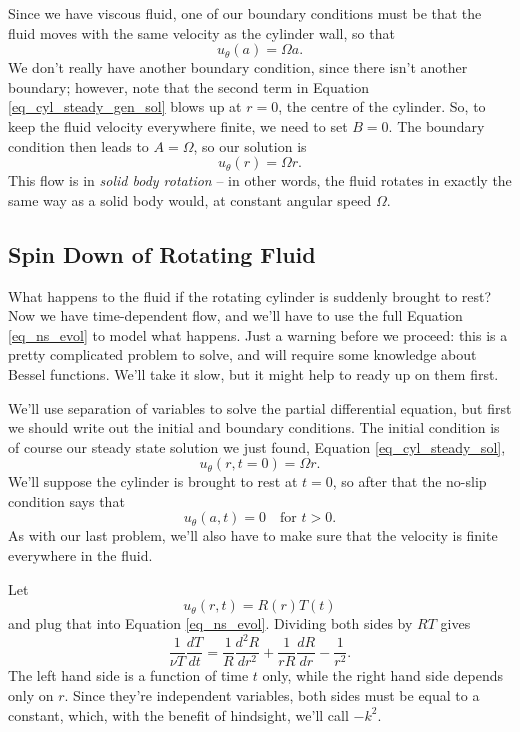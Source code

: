 Since we have viscous fluid, one of our boundary conditions must be that the fluid moves with the same velocity as the cylinder wall, so that
\[
u_\theta(a) = \Omega a.
\]
We don't really have another boundary condition, since there isn't another boundary; however, note that the second term in Equation \ref{eq_cyl_steady_gen_sol} blows up at $r=0$, the centre of the cylinder.  So, to keep the fluid velocity everywhere finite, we need to set $B = 0$.  The boundary condition then leads to $A = \Omega$, so our solution is 
\begin{equation}
\label{eq_cyl_steady_sol}
u_\theta (r) = \Omega r.
\end{equation}
This flow is in \emph{solid body rotation} -- in other words, the fluid rotates in exactly the same way as a solid body would, at constant angular speed $\Omega$.



\subsection{Spin Down of Rotating Fluid}

What happens to the fluid if the rotating cylinder is suddenly brought to rest?  Now we have time-dependent flow, and we'll have to use the full Equation \ref{eq_ns_evol} to model what happens.  Just a warning before we proceed:  this is a pretty complicated problem to solve, and will require some knowledge about Bessel functions.  We'll take it slow, but it might help to ready up on them first.

We'll use separation of variables to solve the partial differential equation, but first we should write out the initial and boundary conditions.  The initial condition is of course our steady state solution we just found, Equation \ref{eq_cyl_steady_sol},
\begin{equation}
\label{eq_spin_ic}
u_\theta (r, t=0) = \Omega r.
\end{equation}
We'll suppose the cylinder is brought to rest at $t=0$, so after that the no-slip condition says that
\begin{equation}
u_\theta(a, t) = 0 \quad \text{for } t > 0.
\end{equation}
As with our last problem, we'll also have to make sure that the velocity is finite everywhere in the fluid.

Let
\[
u_\theta(r, t) = R(r) T(t)
\]
and plug that into Equation \ref{eq_ns_evol}.  Dividing both sides by $RT$ gives
\[
\frac{1}{\nu T} \frac{dT}{dt} = \frac{1}{R} \frac{d^2R}{dr^2} + \frac{1}{rR} \frac{dR}{dr} - \frac{1}{r^2}.
\]
The left hand side is a function of time $t$ only, while the right hand side depends only on $r$.  Since they're independent variables, both sides must be equal to a constant, which, with the benefit of hindsight, we'll call $-k^2$.

